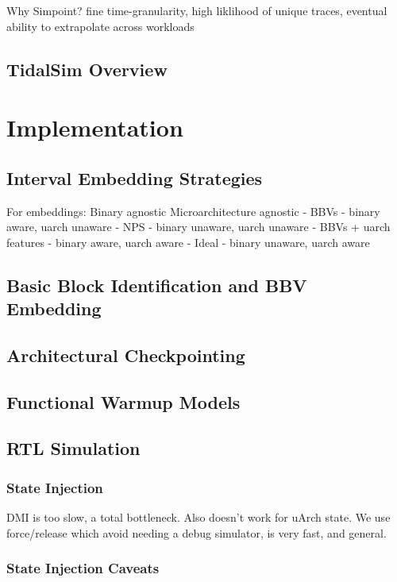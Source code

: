 \documentclass[sigplan,nonacm,10pt]{acmart}
\begin{document}
Why Simpoint? fine time-granularity, high liklihood of unique traces, eventual ability to extrapolate across workloads

\subsection{TidalSim Overview}

\section{Implementation}

\subsection{Interval Embedding Strategies}

For embeddings:
Binary agnostic
Microarchitecture agnostic
- BBVs - binary aware, uarch unaware
- NPS - binary unaware, uarch unaware
- BBVs + uarch features - binary aware, uarch aware
- Ideal - binary unaware, uarch aware

\subsection{Basic Block Identification and BBV Embedding}

\subsection{Architectural Checkpointing}

\subsection{Functional Warmup Models}

\subsection{RTL Simulation}

\subsubsection{State Injection}

DMI is too slow, a total bottleneck. Also doesn't work for uArch state.
We use force/release which avoid needing a debug simulator, is very fast, and general.

\subsubsection{State Injection Caveats}
\end{document}

